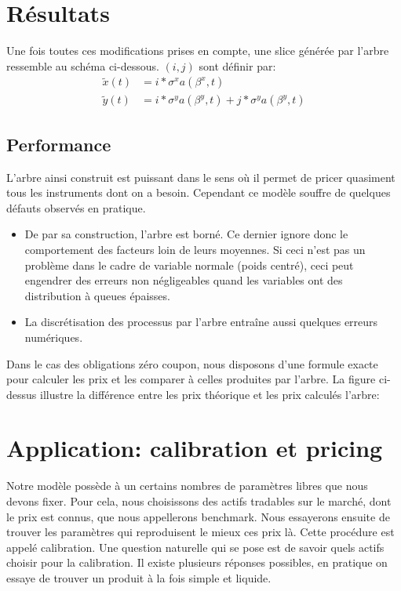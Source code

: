 

\chapter{Résultats}

Une fois toutes ces modifications prises en compte, une slice générée par l'arbre ressemble
au schéma ci-dessous. $(i, j)$ sont définir par:
\begin{align*}
\widetilde x(t) &= i * \sigma^x a(\beta^x, t)\\
\widetilde y(t) &= i * \sigma^y a(\beta^y, t) + j * \sigma^y a(\beta^y, t)
\end{align*}



\section*{Performance}
L'arbre ainsi construit est puissant dans le sens où il permet de pricer quasiment tous les instruments dont on a besoin. Cependant ce modèle souffre de quelques défauts observés en pratique.

\begin{itemize}
\item  De par sa construction, l'arbre est borné. Ce dernier ignore donc le comportement des facteurs loin de leurs moyennes. Si ceci n'est pas un problème dans le cadre de variable normale (poids centré), ceci peut engendrer des erreurs non négligeables quand les variables ont des distribution à queues épaisses.
\item La discrétisation des processus par l'arbre entraîne aussi quelques erreurs numériques.
\end{itemize}

Dans le cas des obligations zéro coupon, nous disposons d'une formule exacte pour calculer les prix et les comparer à celles produites par l'arbre. 
La figure ci-dessus illustre la différence entre les prix théorique et les prix calculés l'arbre:


\chapter{Application: calibration et pricing}
Notre modèle possède à un certains nombres de paramètres libres que nous devons fixer. Pour cela, nous choisissons des actifs tradables sur le marché, dont le prix est connus, que nous appellerons benchmark. Nous essayerons ensuite de trouver les paramètres qui reproduisent le mieux ces prix là. Cette procédure est appelé calibration.
Une question naturelle qui se pose est de savoir quels actifs choisir pour la calibration. Il existe plusieurs réponses possibles, en pratique on essaye de trouver un produit à la fois simple et liquide.

